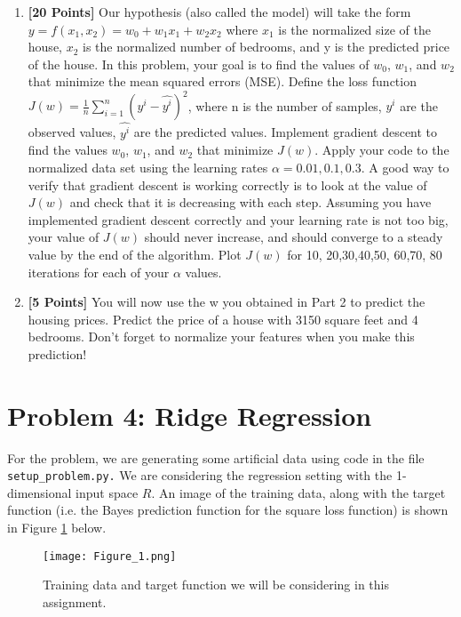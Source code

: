 \documentclass{article}
\begin{document}
\begin{enumerate}
\item {\bf [20 Points]} Our hypothesis (also called the model) will take the form $y=f(x_1, x_2) = w_0+w_1 x_1 +w_2 x_2$ where $x_1$ is the normalized size of the house, $x_2$ is the normalized number of bedrooms, and y is the predicted price of the house. In this problem, your goal is to find the values of $w_0$, $w_1$, and $w_2$ that minimize the mean squared errors (MSE). \newline
Define the loss function $J(w)= \frac{1}{n} \sum \limits_{i=1} ^{n} (y^{i}-\hat{y^{i}})^2$, where n is the number of samples, $y^{i}$ are the observed values, $\hat{y^{i}}$ are the predicted values. 
Implement gradient descent to find the values $w_0$, $w_1$, and $w_2$ that minimize $J(w)$. Apply your code to the normalized data set using the learning rates $\alpha = 0.01, 0.1, 0.3$. \newline
A good way to verify that gradient descent is working correctly is to look at the value of $J(w)$ and check that it is decreasing with each step.  Assuming you have implemented gradient descent correctly and your learning rate is not too big,  your value of $J(w)$ should never increase, and should converge to a steady value by the end of the algorithm. Plot $J(w)$ for 10, 20,30,40,50, 60,70, 80 iterations for  each of your $\alpha$ values.

\item {\bf [5 Points]} You will now use the w you obtained in Part 2 to predict the housing prices. 
Predict the price of a house with 3150 square feet and 4 bedrooms. Don't forget to normalize your features when you make this prediction!

\end{enumerate}





\section*{Problem 4: Ridge Regression} 

For the problem, we are generating some artificial data using code in the file \texttt{setup\_problem.py.} We are considering the regression
setting with the 1-dimensional input space $R$. An image of the training data, along with the target function (i.e. the Bayes
prediction function for the square loss function) is shown in Figure
\ref{fig:Training-data-and-target-fn} below.
\begin{figure}
\begin{centering}
\texttt{[image: Figure\_1.png]}
\par\end{centering}
\caption{\label{fig:Training-data-and-target-fn}Training data and target function
we will be considering in this assignment.}
\end{figure}
\end{document}
